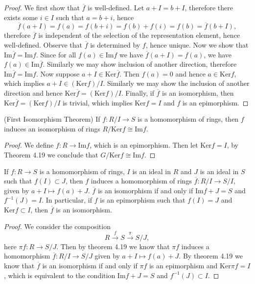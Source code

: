\begin{proof}
We first show that $\overline{f}$ is well-defined. Let $a+I=b+I$, therefore there exists some $i\in I$ such that $a=b+i$, hence 
$$
\overline{f}\left( a+I \right) =f\left( a \right) =f\left( b+i \right) =f\left( b \right) +f\left( i \right) =f\left( b \right) =\overline{f}\left( b+I \right) ,
$$
therefore $\overline{f}$ is independent of the selection of the representation element, hence well-defined. Observe that $\overline{f}$ is determined by $f$, hence unique. Now we show that $\mathrm{Im}\overline{f}=\mathrm{Im}f$. Since for all $f(a)\in\mathrm{Im}f$ we have $\overline{f}(a+I)=f(a)$, we have $f(a)\in\mathrm{Im}\overline{f}$. Similarly we may show inclusion of another direction, therefore $\mathrm{Im}\overline{f}=\mathrm{Im}f$. Now suppose $a+I\in\mathrm{Ker}\overline{f}$. Then $f(a)=0$ and hence $a\in\mathrm{Ker}f$, which implies $a+I\in(\mathrm{Ker}f)/I$. Similarly we may show the inclusion of another direction and hence $\mathrm{Ker}\overline{f}=(\mathrm{Ker}f)/I$. Finally, if $\overline{f}$ is an isomorphism, then $\mathrm{Ker}\overline{f}=(\mathrm{Ker}f)/I$ is trivial, which implies $\mathrm{Ker}f=I$ and $f$ is an epimorphism.
\end{proof}
\begin{corollary}(First Isomorphism Theorem)
If $f:R/I\to S$ is a homomorphism of rings, then $f$ induces an isomorphism of rings $R/\mathrm{Ker}f\cong\mathrm{Im}f$.
\end{corollary}
\begin{proof}
We define $f:R\to\mathrm{Im}f$, which is an epimorphism. Then let $\mathrm{Ker}f=I$, by Theorem 4.19 we conclude that $G/\mathrm{Ker}f\cong\mathrm{Im}f$.
\end{proof}
\begin{corollary}
If $f:R\to S$ is a homomorphism of rings, $I$ is an ideal in $R$ and $J$ is an ideal in $S$ such that $f(I)\subset J$, then $f$ induces a homomorphism of rings $\overline{f}:R/I\to S/I$, given by $a+I\mapsto f(a)+J$. $\overline{f}$ is an isomorphism if and only if $\mathrm{Im}f+J=S$ and $f^{-1}(J)=I$. In particular, if $f$ is an epimorphism such that $f(I)=J$ and $\mathrm{Ker}f\subset I$, then $\overline{f}$ is an isomorphism.
\end{corollary}
\begin{proof}
We consider the composition 
$$
R\overset{f}{\longrightarrow}S\overset{\pi}{\longrightarrow}S/J,
$$
here $\pi f:R\to S/J$. Then by theorem 4.19 we know that $\pi f$ induces a homomorphism $\overline{f}:R/I\to S/J$ given by $a+I\mapsto f(a)+J$. By theorem 4.19 we know that $\overline{f}$ is an isomorphism if and only if $\pi f$ is an epimorphism and $\mathrm{Ker}\pi f=I$, which is equivalent to the condition $\mathrm{Im}f+ J=S$ and $f^{-1}(J)\subset I$.
\end{proof}
